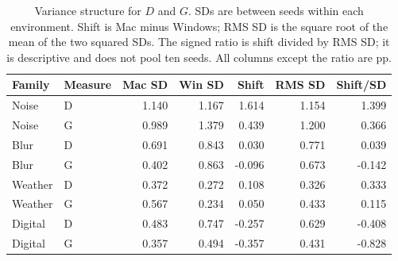 \begin{table}[!htbp]\centering\small
\setlength{\tabcolsep}{4pt}
\caption{Variance structure for $D$ and $G$. SDs are between seeds within each environment. Shift is Mac minus Windows; RMS SD is the square root of the mean of the two squared SDs. The signed ratio is shift divided by RMS SD; it is descriptive and does not pool ten seeds. All columns except the ratio are pp. \posthoc}\label{tab:variance}
\begin{tabular}{llrrrrr}
\toprule
Family & Measure & Mac SD & Win SD & Shift & RMS SD & Shift/SD\\\midrule
Noise & D & 1.140 & 1.167 & 1.614 & 1.154 & 1.399\\
Noise & G & 0.989 & 1.379 & 0.439 & 1.200 & 0.366\\
Blur & D & 0.691 & 0.843 & 0.030 & 0.771 & 0.039\\
Blur & G & 0.402 & 0.863 & -0.096 & 0.673 & -0.142\\
Weather & D & 0.372 & 0.272 & 0.108 & 0.326 & 0.333\\
Weather & G & 0.567 & 0.234 & 0.050 & 0.433 & 0.115\\
Digital & D & 0.483 & 0.747 & -0.257 & 0.629 & -0.408\\
Digital & G & 0.357 & 0.494 & -0.357 & 0.431 & -0.828\\
\bottomrule\end{tabular}\end{table}
